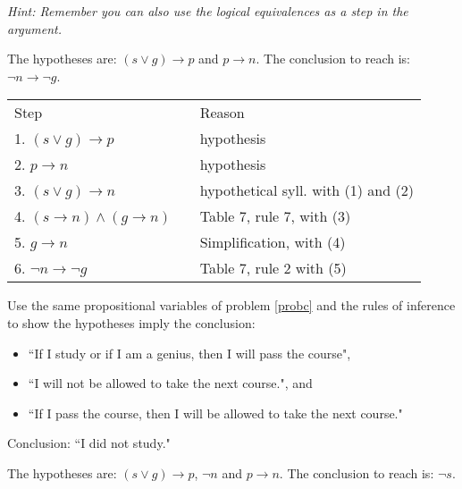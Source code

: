 \documentclass[12pt,addpoints]{exam}
\newcommand{\ra}{\rightarrow}
\begin{document}
\begin{questions}
\textit{Hint: Remember you can also use the logical equivalences as a step in the argument.}
    \ifprintanswers
        \vspace{-10pt}
    \fi
\begin{solution}
    The hypotheses are: $(s \vee g) \ra p$ and $p \ra n$.
    The conclusion to reach is: $\neg n \ra \neg g$.

    \begin{tabular}{lll}
        Step    & \hspace{0.2in} & Reason \\
        1. $(s \vee g) \ra p$           & & hypothesis \\
        2. $p \ra n$                    & & hypothesis \\
        3. $(s \vee g) \ra n$           & & hypothetical syll. with (1) and (2) \\
        4. $(s \ra n) \wedge (g \ra n)$ & & Table 7, rule 7, with (3) \\
        5. $g \ra n$                    & & Simplification, with (4) \\
        6. $\neg n \ra \neg g$          & & Table 7, rule 2 with (5) \\
    \end{tabular}
\end{solution}

\question[8] Use the same propositional variables of problem \ref{probc} and the rules of inference to show the hypotheses imply the conclusion:
\begin{itemize}[itemsep=0pt,parsep=0pt,topsep=0pt,partopsep=0pt]
    \item ``If I study or if I am a genius, then I will pass the course",
    \item ``I will not be allowed to take the next course.", and
    \item ``If I pass the course, then I will be allowed to take the next course."
\end{itemize}
Conclusion:  ``I did not study."
    \ifprintanswers
        \vspace{-10pt}
    \fi
\begin{solution}
    The hypotheses are: $(s \vee g) \ra p$, $\neg n$ and $p \ra n$.
    The conclusion to reach is: $\neg s$.


\end{solution}
\end{questions}
\end{document}
